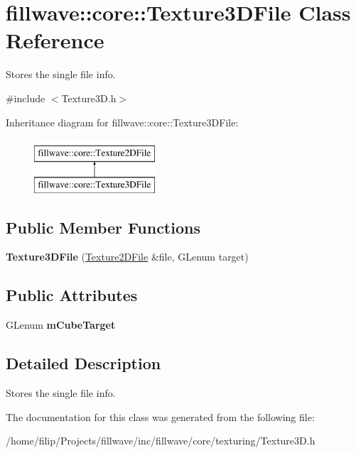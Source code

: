 \hypertarget{classfillwave_1_1core_1_1Texture3DFile}{}\section{fillwave\+:\+:core\+:\+:Texture3\+D\+File Class Reference}
\label{classfillwave_1_1core_1_1Texture3DFile}


Stores the single file info.  




{\ttfamily \#include $<$Texture3\+D.\+h$>$}

Inheritance diagram for fillwave\+:\+:core\+:\+:Texture3\+D\+File\+:\begin{figure}[H]
\begin{center}
\leavevmode
\includegraphics[height=2.000000cm]{classfillwave_1_1core_1_1Texture3DFile}
\end{center}
\end{figure}
\subsection*{Public Member Functions}
\begin{DoxyCompactItemize}
\item 
\hypertarget{classfillwave_1_1core_1_1Texture3DFile_a76a00a3165c70497ba9813b16a7f3fef}{}{\bfseries Texture3\+D\+File} (\hyperlink{classfillwave_1_1core_1_1Texture2DFile}{Texture2\+D\+File} \&file, G\+Lenum target)\label{classfillwave_1_1core_1_1Texture3DFile_a76a00a3165c70497ba9813b16a7f3fef}

\end{DoxyCompactItemize}
\subsection*{Public Attributes}
\begin{DoxyCompactItemize}
\item 
\hypertarget{classfillwave_1_1core_1_1Texture3DFile_a6a6198593fcc06a276c52c3d7b055951}{}G\+Lenum {\bfseries m\+Cube\+Target}\label{classfillwave_1_1core_1_1Texture3DFile_a6a6198593fcc06a276c52c3d7b055951}

\end{DoxyCompactItemize}


\subsection{Detailed Description}
Stores the single file info. 

The documentation for this class was generated from the following file\+:\begin{DoxyCompactItemize}
\item 
/home/filip/\+Projects/fillwave/inc/fillwave/core/texturing/Texture3\+D.\+h\end{DoxyCompactItemize}
